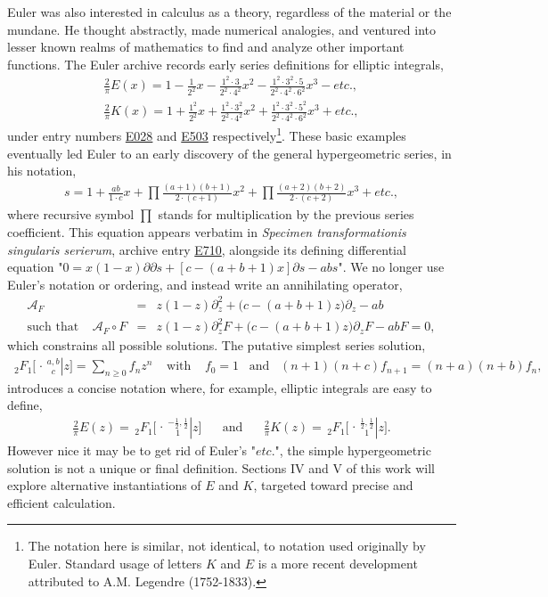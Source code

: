 \documentclass[nofootinbib,preprint]{revtex4-1}
\newcommand{\tFo}[3]{\,_2F_1 \bigg[ 
\genfrac.|{0pt}{}{#1}{#2} #3 \bigg]}
\begin{document}
Euler was also interested in calculus as a theory, regardless of the material or 
the mundane. He thought abstractly, made numerical analogies, and ventured into 
lesser known realms of mathematics to find and analyze other important functions. 
The Euler archive records early series definitions for elliptic integrals,
\begin{eqnarray}
\frac{2}{\pi}E(x) = 1 -\frac{1}{2^2}x  
-\frac{1^2 \cdot 3}{2^2 \cdot 4^2}x^2 
-\frac{1^2 \cdot 3^2 \cdot 5}{2^2 \cdot 4^2 \cdot 6^2}x^3 - etc., \nonumber \\
\frac{2}{\pi}K(x) = 1 +\frac{1^2}{2^2}x 
+\frac{1^2 \cdot 3^2}{2^2 \cdot 4^2}x^2 
+\frac{1^2 \cdot 3^2 \cdot 5^2}{2^2 \cdot 4^2 \cdot 6^2}x^3 + etc., \nonumber 
\end{eqnarray}
under entry numbers     
\href{http://eulerarchive.maa.org/pages/E028.html}{E028} and
\href{http://eulerarchive.maa.org/pages/E503.html}{E503}  respectively\footnote{The 
notation here is similar, not identical, to notation used originally by Euler. Standard
usage of letters $K$ and $E$ is a more recent development attributed to A.M. Legendre (1752-1833).}.  
These basic examples eventually led Euler to an early discovery of the general hypergeometric 
series, in his notation, 
\begin{eqnarray}
s = 1 + \frac{ab}{1\cdot c} x + \prod \frac{(a+1)(b+1)}{2\cdot(c+1)} x^2
 + \prod \frac{(a+2)(b+2)}{2\cdot(c+2)} x^3 + etc.,  \nonumber
\end{eqnarray}
where recursive symbol $\prod$ stands for multiplication by the previous series 
coefficient. This equation appears verbatim in 
\textit{Specimen transformationis singularis serierum}, 
archive entry \href{http://eulerarchive.maa.org/pages/E710.html}{E710}, alongside
its defining differential equation 
"$0=x(1-x)\partial\partial s +[c-(a+b+1)x]\partial s - a b s$". We no longer 
use Euler's notation or ordering, and instead write an annihilating operator, 
\begin{eqnarray}
\mathcal{A}_F &=& z(1-z)\partial^2_z  +\big(c-(a+b+1)z\big)\partial_z  - a b 
 \nonumber \\
\text{such that} \;\;\;\; \mathcal{A}_F \circ F &=& z(1-z)\partial^2_z F  
+\big(c-(a+b+1)z\big)\partial_z F  - a b F = 0, \nonumber
\end{eqnarray}
which constrains all possible solutions. The putative simplest series solution,
\begin{eqnarray}
\tFo{a,b}{c}{z} = \sum_{n\ge 0} f_n z^n 
\;\;\;\; \text{with} \;\;\;\; f_0=1 \;\;\;\text{and} 
\;\;\; (n+1)(n+c)f_{n+1}=(n+a)(n+b)f_n , \nonumber
\end{eqnarray}
introduces a concise notation where, for example, 
elliptic integrals are easy to define, 
\begin{eqnarray}
\frac{2}{\pi} E(z) = \tFo{-\frac{1}{2},\frac{1}{2}}{1}{z}
\;\;\;\;\;\; \text{and} \;\;\;\;\;\;
\frac{2}{\pi} K(z) = \tFo{\frac{1}{2},\frac{1}{2}}{1}{z}.  \nonumber   
\end{eqnarray}
However nice it may be to get rid of Euler's "$etc.$", the simple hypergeometric 
solution is not a unique or final definition. Sections IV and V of this work 
will explore alternative instantiations of $E$ and $K$, targeted toward precise 
and efficient calculation.
\end{document}
